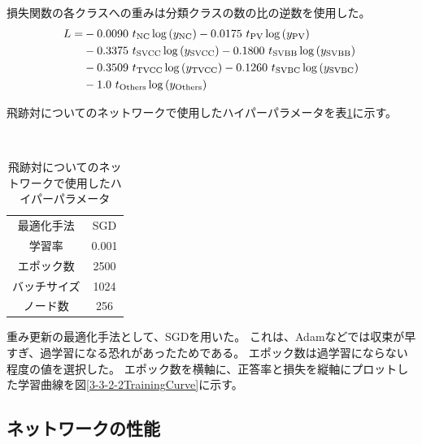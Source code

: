 損失関数の各クラスへの重みは分類クラスの数の比の逆数を使用した。
\begin{equation}
 \begin{split}
 L = & - 0.0090\  t_{\rm NC} \log{(y_{\rm NC})} - 0.0175\  t_{\rm PV} \log{(y_{\rm PV})} \\
       & - 0.3375\  t_{\rm SVCC} \log{(y_{\rm SVCC})} - 0.1800\  t_{\rm SVBB} \log{(y_{\rm SVBB})}\\
       & - 0.3509\  t_{\rm TVCC} \log{(y_{\rm TVCC})} - 0.1260\  t_{\rm SVBC} \log{(y_{\rm SVBC})}\\
       & - 1.0\  t_{\rm Others} \log{(y_{\rm Others})}\\
 \end{split}
\end{equation}

飛跡対についてのネットワークで使用したハイパーパラメータを表\ref{HyperparametersforPairModel}に示す。

\begin{table}[htb]
 \centering
　\small
  \begin{tabular}{c c}\hline
    最適化手法 & SGD\\
    学習率 & 0.001\\
    エポック数 & 2500\\
    バッチサイズ & 1024\\
    ノード数 & 256\\ \hline
  \end{tabular}
  \caption{飛跡対についてのネットワークで使用したハイパーパラメータ}
  \label{HyperparametersforPairModel}
\end{table}

重み更新の最適化手法として、SGDを用いた。
これは、Adamなどでは収束が早すぎ、過学習になる恐れがあったためである。
エポック数は過学習にならない程度の値を選択した。
エポック数を横軸に、正答率と損失を縦軸にプロットした学習曲線を図\ref{3-3-2-2TrainingCurve}に示す。



\subsection{ネットワークの性能} \label{Net:PM:PerformanceofPM}

